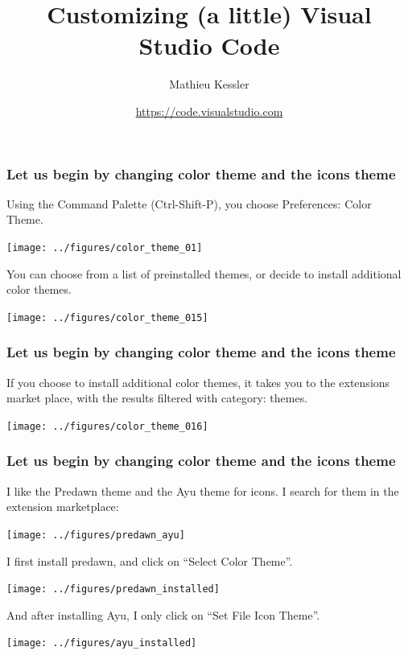 \documentclass[9pt]{beamer}
\begin{document}
\title{Customizing (a little) Visual Studio Code}

\author[Mathieu Kessler]{Mathieu Kessler}
\date{\href{https://code.visualstudio.com}{https://code.visualstudio.com}}

\begin{frame}
  \titlepage
\end{frame}

\begin{frame}
  \frametitle{Let us begin by changing color theme and the icons
    theme}
  Using the Command Palette (Ctrl-Shift-P), you choose Preferences:
  Color Theme.
  \begin{center}
    \texttt{[image: ../figures/color\_theme\_01]}
  \end{center}\pause
  You can choose from a list of preinstalled themes, or decide to
  install additional color themes.
  \begin{center}
    \texttt{[image: ../figures/color\_theme\_015]}
  \end{center}\pause
\end{frame}

\begin{frame}
  \frametitle{Let us begin by changing color theme and the icons
    theme}
  If you choose to install additional color themes, it takes you to
  the extensions market place, with the results filtered with
  category: themes.
  \begin{center}
    \texttt{[image: ../figures/color\_theme\_016]}
  \end{center}\pause
\end{frame}

\begin{frame}
  \frametitle{Let us begin by changing color theme and the icons
    theme}
  I like the Predawn theme and the Ayu theme for icons. I search for them in the extension marketplace:
  \begin{center}
    \texttt{[image: ../figures/predawn\_ayu]}
  \end{center}\pause
  I first install predawn, and click on ``Select Color Theme''.
   \begin{center}
    \texttt{[image: ../figures/predawn\_installed]}
  \end{center}\pause
  And after installing Ayu, I only click on ``Set File Icon Theme''.
  \begin{center}
    \texttt{[image: ../figures/ayu\_installed]}
  \end{center}
\end{frame}
\end{document}
